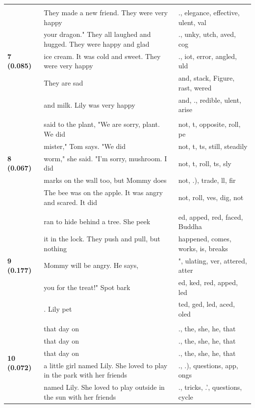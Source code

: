 \documentclass{article}
\theoremstyle{plain}
\theoremstyle{definition}
\theoremstyle{remark}
\begin{document}
\begin{longtable}{|p{}|p{}|p{}|}
& & \\
\multirow{5}{*}{\textbf{7 (0.085)}} & They made a new friend. They were very happy & .,  elegance, effective, ulent, val \\
& your dragon."  They all laughed and hugged. They were happy and glad & ., unky, utch, aved,  cog \\
& ice cream. It was cold and sweet. They were very happy & ., iot,  error, angled, uld \\
& They are sad & and, stack, Figure, rast, wered \\
& and milk. Lily was very happy & and, ., redible, ulent,  arise \\
& & \\
\multirow{5}{*}{\textbf{8 (0.067)}} & said to the plant, "We are sorry, plant. We did & not, t,  opposite,  roll, pe \\
& mister," Tom says. "We did & not, t, ts,  still,  steadily \\
& worm," she said. "I'm sorry, mushroom. I did & not, t,  roll, ts,  sly \\
& marks on the wall too, but Mommy does & not, .),  trade,  ll,  fir \\
& The bee was on the apple. It was angry and scared. It did & not,  roll, ves, dig, not \\
& & \\
\multirow{5}{*}{\textbf{9 (0.177)}} & ran to hide behind a tree. She peek & ed, apped, red, faced,  Buddha \\
& it in the lock. They push and pull, but nothing & happened,  comes,  works,  is,  breaks \\
& Mommy will be angry. He says, & ", ulating, ver, attered, atter \\
& you for the treat!" Spot bark & ed, ked, red, apped, led \\
& . Lily pet & ted, ged, led, aced, oled \\
& & \\
\multirow{5}{*}{\textbf{10 (0.072)}} & that day on & .,  the,  she,  he,  that \\
& that day on & .,  the,  she,  he,  that \\
& that day on & .,  the,  she,  he,  that \\
& a little girl named Lily. She loved to play in the park with her friends & ., .),  questions,  app, ongs \\
& named Lily. She loved to play outside in the sun with her friends & .,  tricks, .',  questions,  cycle \\

\end{longtable}
\end{document}
